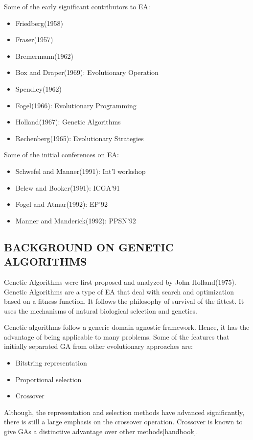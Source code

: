\documentclass[12pt,a4paper]{article}
\begin{document}
	Some of the early significant contributors to EA:
	\begin{itemize}
	\item Friedberg(1958)
	\item Fraser(1957)
	\item Bremermann(1962)
	\item Box and Draper(1969): Evolutionary Operation
	\item Spendley(1962)
	\item Fogel(1966): Evolutionary Programming
	\item Holland(1967): Genetic Algorithms
	\item Rechenberg(1965): Evolutionary Strategies
	\end{itemize}
	
	Some of the initial conferences on EA:
	\begin{itemize}
	\item Schwefel and Manner(1991): Int'l workshop
	\item Belew and Booker(1991): ICGA'91
	\item Fogel and Atmar(1992): EP'92
	\item Manner and Manderick(1992): PPSN'92
	\end{itemize}
	
	\subsection{BACKGROUND ON GENETIC ALGORITHMS}
	Genetic Algorithms were first proposed and analyzed by John Holland(1975). Genetic Algorithms are a type of EA that deal with search and optimization based on a fitness function. It follows the philosophy of survival of the fittest. It uses the mechanisms of natural biological selection and genetics. \par
	Genetic algorithms follow a generic domain agnostic framework. Hence, it has the advantage of being applicable to many problems. Some of the features that initially separated GA from other evolutionary approaches are:
	\begin{itemize}	
	\item Bitstring representation
	\item Proportional selection
	\item Crossover
	\end{itemize}
	Although, the representation and selection methods have advanced significantly, there is still a large emphasis on the crossover operation. Crossover is known to give GAs a distinctive advantage over other methods[handbook]. \par
	
\end{document}
